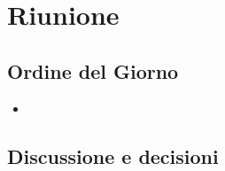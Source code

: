 \section{Riunione}
\subsection{Ordine del Giorno}
\begin{itemize}
	\item 
\end{itemize}

\subsection{Discussione e decisioni}

\subsubsection{}



\clearpage
